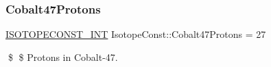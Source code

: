\subsubsection{\texorpdfstring{Cobalt47\+Protons}{Cobalt47Protons}}
{\footnotesize\ttfamily \mbox{\hyperlink{group___isotope_const-_macros_ga5f18360b3e99483a35c32d789e62621c}{I\+S\+O\+T\+O\+P\+E\+C\+O\+N\+S\+T\+\_\+\+I\+NT}} Isotope\+Const\+::\+Cobalt47\+Protons = 27}

\$ \$ Protons in Cobalt-\/47. 